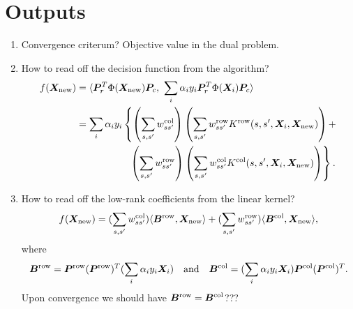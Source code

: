\documentclass[11pt]{article}
\theoremstyle{plain}
\theoremstyle{definition}
\newcommand*{\KeepStyleUnderBrace}[1]{%
  \mathop{%
    \mathchoice
    {\underbrace{\displaystyle#1}}%
    {\underbrace{\textstyle#1}}%
    {\underbrace{\scriptstyle#1}}%
    {\underbrace{\scriptscriptstyle#1}}%
  }\limits
}
\begin{document}
\section{Outputs}
\begin{enumerate}
\item Convergence criterum? Objective value in the dual problem.

\item How to read off the decision function from the algorithm?
\begin{align}\label{eq:function}
f(\bm X_{\text{new}}) &=\langle  \bm{P}^T_r\Phi(\bm X_{\text{new}})\bm{P}_c, \ \sum_i\alpha_iy_i\bm{P}^T_r\Phi(\bm X_i)\bm{P}_c\rangle \notag \\
&=\sum_i \alpha_i y_i \left\{ \left(\sum_{s,s'}w^{\text{col}}_{ss'}\right)\left(\sum_{s,s'}w^{\text{row}}_{ss'}K^{\text{row}}(s,s',\bm X_i,\bm X_{\text{new}})\right)+\right.\notag \\
&\quad\quad\quad\quad\quad\ \left. \left(\sum_{s,s'}w^{\text{row}}_{ss'}\right)\left(\sum_{s,s'}w^{\text{col}}_{ss'}K^{\text{col}}(s,s',\bm X_i,\bm X_{\text{new}})\right)\right\}.
\end{align}

\item How to read off the low-rank coefficients from the linear kernel?
\begin{equation}
f(\bm X_{\text{new}})=(\sum_{s,s'}w^{\text{col}}_{ss'})\langle \bm B^{\text{row}}, \bm X_{\text{new}}\rangle + (\sum_{s,s'}w^{\text{row}}_{ss'})\langle \bm B^{\text{col}}, \bm X_{\text{new}}\rangle, 
\end{equation}
where 
\[\bm B^{\text{row}}=\bm{P}^{\text{row}}(\bm{P}^{\text{row}})^T(\sum_i\alpha_iy_i\bm X_i)\quad  \text{and} \quad \bm B^{\text{col}}=(\sum_i\alpha_iy_i\bm X_i)\bm{P}^{\text{col}}(\bm{P}^{\text{col}})^T.
\]
Upon convergence we should have $\bm B^{\text{row}} = \bm B^{\text{col}}$???


\end{enumerate}
\end{document}
